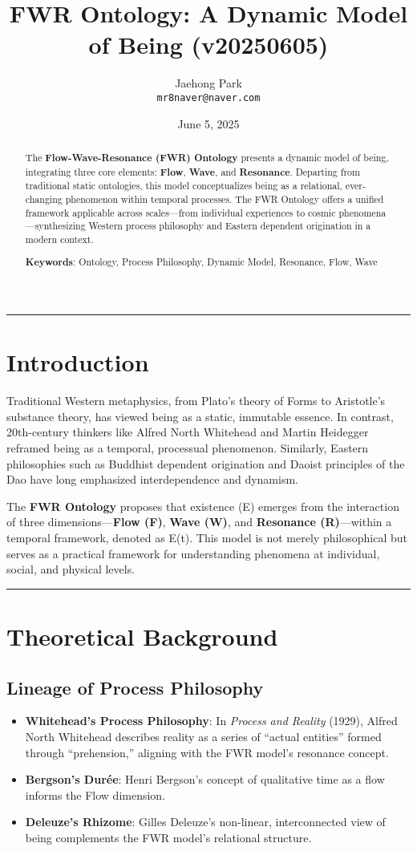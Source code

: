 \documentclass{article}
\title{FWR Ontology: A Dynamic Model of Being (v20250605)}
\author{Jaehong Park \\ \texttt{mr8naver@naver.com}}
\date{June 5, 2025}
\begin{document}
\maketitle

\begin{abstract}
The \textbf{Flow-Wave-Resonance (FWR) Ontology} presents a dynamic model of being, integrating three core elements: \textbf{Flow}, \textbf{Wave}, and \textbf{Resonance}. Departing from traditional static ontologies, this model conceptualizes being as a relational, ever-changing phenomenon within temporal processes. The FWR Ontology offers a unified framework applicable across scales—from individual experiences to cosmic phenomena—synthesizing Western process philosophy and Eastern dependent origination in a modern context.

\textbf{Keywords}: Ontology, Process Philosophy, Dynamic Model, Resonance, Flow, Wave
\end{abstract}

\hrule

\section{Introduction}
Traditional Western metaphysics, from Plato’s theory of Forms to Aristotle’s substance theory, has viewed being as a static, immutable essence. In contrast, 20th-century thinkers like Alfred North Whitehead and Martin Heidegger reframed being as a temporal, processual phenomenon. Similarly, Eastern philosophies such as Buddhist dependent origination and Daoist principles of the Dao have long emphasized interdependence and dynamism.

The \textbf{FWR Ontology} proposes that existence (E) emerges from the interaction of three dimensions—\textbf{Flow (F)}, \textbf{Wave (W)}, and \textbf{Resonance (R)}—within a temporal framework, denoted as E(t). This model is not merely philosophical but serves as a practical framework for understanding phenomena at individual, social, and physical levels.

\hrule

\section{Theoretical Background}

\subsection{Lineage of Process Philosophy}
\begin{itemize}
    \item \textbf{Whitehead’s Process Philosophy}: In \textit{Process and Reality} (1929), Alfred North Whitehead describes reality as a series of “actual entities” formed through “prehension,” aligning with the FWR model’s resonance concept.
    \item \textbf{Bergson’s Durée}: Henri Bergson’s concept of qualitative time as a flow informs the Flow dimension.
    \item \textbf{Deleuze’s Rhizome}: Gilles Deleuze’s non-linear, interconnected view of being complements the FWR model’s relational structure.
\end{itemize}
\end{document}
